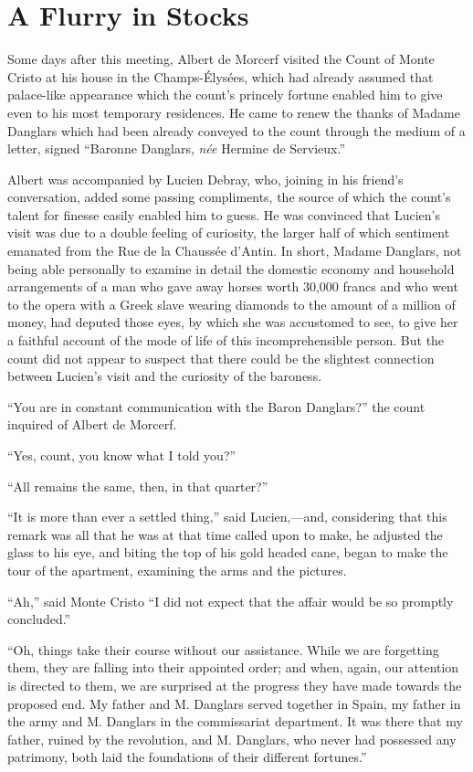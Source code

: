 \chapter{A Flurry in Stocks}

Some days after this meeting, Albert de Morcerf visited the Count of
Monte Cristo at his house in the Champs-Élysées, which had already
assumed that palace-like appearance which the count’s princely fortune
enabled him to give even to his most temporary residences. He came to
renew the thanks of Madame Danglars which had been already conveyed to
the count through the medium of a letter, signed “Baronne Danglars,
\textit{née} Hermine de Servieux.”

Albert was accompanied by Lucien Debray, who, joining in his friend’s
conversation, added some passing compliments, the source of which the
count’s talent for finesse easily enabled him to guess. He was
convinced that Lucien’s visit was due to a double feeling of curiosity,
the larger half of which sentiment emanated from the Rue de la Chaussée
d’Antin. In short, Madame Danglars, not being able personally to
examine in detail the domestic economy and household arrangements of a
man who gave away horses worth 30,000 francs and who went to the opera
with a Greek slave wearing diamonds to the amount of a million of
money, had deputed those eyes, by which she was accustomed to see, to
give her a faithful account of the mode of life of this
incomprehensible person. But the count did not appear to suspect that
there could be the slightest connection between Lucien’s visit and the
curiosity of the baroness.

“You are in constant communication with the Baron Danglars?” the count
inquired of Albert de Morcerf.

“Yes, count, you know what I told you?”

“All remains the same, then, in that quarter?”

“It is more than ever a settled thing,” said Lucien,—and, considering
that this remark was all that he was at that time called upon to make,
he adjusted the glass to his eye, and biting the top of his gold headed
cane, began to make the tour of the apartment, examining the arms and
the pictures.

“Ah,” said Monte Cristo “I did not expect that the affair would be so
promptly concluded.”

“Oh, things take their course without our assistance. While we are
forgetting them, they are falling into their appointed order; and when,
again, our attention is directed to them, we are surprised at the
progress they have made towards the proposed end. My father and M.
Danglars served together in Spain, my father in the army and M.
Danglars in the commissariat department. It was there that my father,
ruined by the revolution, and M. Danglars, who never had possessed any
patrimony, both laid the foundations of their different fortunes.”

